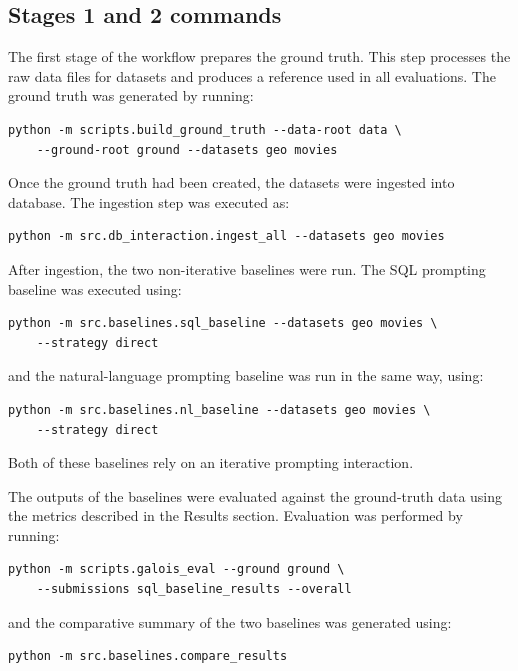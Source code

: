 \documentclass[12pt]{article}
\begin{document}
\subsection{Stages 1 and 2 commands}
The first stage of the workflow prepares the ground truth. This step processes the raw data files for datasets and produces a reference used in all evaluations. The ground truth was generated by running:

\begin{verbatim}
python -m scripts.build_ground_truth --data-root data \
    --ground-root ground --datasets geo movies
\end{verbatim}

Once the ground truth had been created, the datasets were ingested into database. The ingestion step was executed as:

\begin{verbatim}
python -m src.db_interaction.ingest_all --datasets geo movies
\end{verbatim}

After ingestion, the two non-iterative baselines were run. The SQL prompting baseline was executed using:

\begin{verbatim}
python -m src.baselines.sql_baseline --datasets geo movies \
    --strategy direct
\end{verbatim}

and the natural-language prompting baseline was run in the same way, using:

\begin{verbatim}
python -m src.baselines.nl_baseline --datasets geo movies \
    --strategy direct
\end{verbatim}

Both of these baselines rely on an iterative prompting interaction. 

The outputs of the baselines were evaluated against the ground-truth data using the metrics described in the Results section. Evaluation was performed by running:

\begin{verbatim}
python -m scripts.galois_eval --ground ground \
    --submissions sql_baseline_results --overall
\end{verbatim}

and the comparative summary of the two baselines was generated using:

\begin{verbatim}
python -m src.baselines.compare_results
\end{verbatim}
\end{document}
